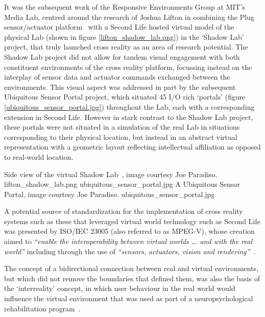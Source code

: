 It was the subsequent work of the Responsive Environments Group at MIT's Media Lab, centred around the research of Joshua Lifton in combining the Plug sensor/actuator platform~\cite{Lifton2007b} with a Second Life hosted virtual model of the physical Lab (shown in figure \ref{lifton_shadow_lab.png}) in the `Shadow Lab' project, that truly launched cross reality as an area of research potential. The Shadow Lab project did not allow for tandem visual engagement with both constituent environments of the cross reality platform, focussing instead on the interplay of sensor data and actuator commands exchanged between the environments. This visual aspect was addressed in part by the subsequent Ubiquitous Sensor Portal project, which situated 45 I/O rich `portals' (figure \ref{ubiquitous_sensor_portal.jpg}) throughout the Lab, each with a corresponding extension in Second Life. However in stark contrast to the Shadow Lab project, these portals were not situated in a simulation of the real Lab in situations corresponding to their physical location, but instead in an abstract virtual representation with a geometric layout reflecting intellectual affiliation as opposed to real-world location.

 {Side view of the virtual Shadow Lab~\cite{Lifton2007a}, image courtesy Joe Paradiso.} {lifton_shadow_lab.png}
       {ubiquitous_sensor_portal.jpg} {A Ubiquitous Sensor Portal\protect\footnotemark , image courtesy Joe Paradiso.} {ubiquitous_sensor_portal.jpg}


A potential source of standardization for the implementation of cross reality systems such as these that leveraged virtual world technology such as Second Life was presented by ISO/IEC 23005 (also referred to as MPEG-V), whose creation aimed to \textit{``enable the interoperability between virtual worlds \ldots\ and with the real world''} including through the use of \textit{``sensors, actuators, vision and rendering''}~\cite{InternationalOrganizationforStandardization2011}.

The concept of a bidirectional connection between real and virtual environments, but which did not remove the boundaries that defined them, was also the basis of the `interreality' concept, in which user behaviour in the real world would influence the virtual environment that was used as part of a neuropsychological rehabilitation program~\cite{Giuseppe2014a}.

